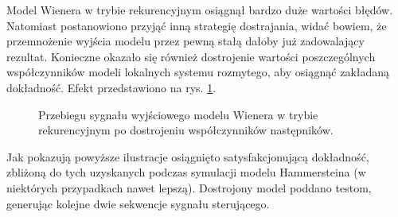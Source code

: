 \documentclass[a4paper,titlepage,11pt,floatssmall]{mwrep}
\begin{document}
Model Wienera w trybie rekurencyjnym osiągnął bardzo duże wartości błędów. Natomiast postanowiono przyjąć inną strategię dostrajania, widać bowiem, że przemnożenie wyjścia modelu przez pewną stałą dałoby już zadowalający rezultat. Konieczne okazało się również dostrojenie wartości poszczególnych współczynników modeli lokalnych systemu rozmytego, aby osiągnąć zakładaną dokładność. Efekt przedstawiono na rys. \ref{wien_oe}.

\newpage

\begin{figure}[h!]
\centering
{}
\vfill
{}
\caption{Przebiegu sygnału wyjściowego modelu Wienera w trybie rekurencyjnym po dostrojeniu współczynników następników.}
\label{wien_oe}
\end{figure}

Jak pokazują powyższe ilustracje osiągnięto satysfakcjonującą dokładność, zbliżoną do tych uzyskanych podczas symulacji modelu Hammersteina (w niektórych przypadkach nawet lepszą). Dostrojony model poddano testom, generując kolejne dwie sekwencje sygnału sterującego.
\end{document}
